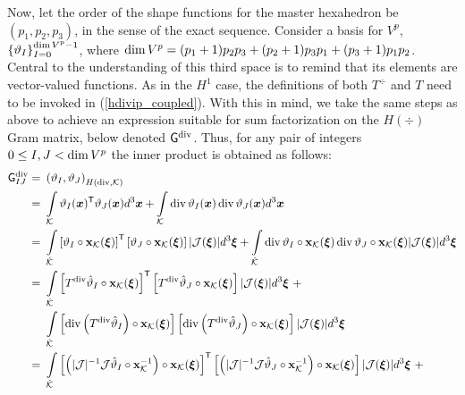 Now, let the order of the shape functions for the master hexahedron be $(p_1,p_2,p_3)$, in the sense of the exact sequence. Consider a basis for $V^p$, $\left\{ \vartheta_I \right\}_{I=0}^{\operatorname*{dim} V^p-1}$, where $\operatorname*{dim} V^p=(p_1+1)p_2p_3+(p_2+1)p_3p_1+(p_3+1)p_1p_2$. Central to the understanding of this third space is to remind that its elements are vector-valued functions. As in the $H^1$ case, the definitions of both $T^{\div}$ and $T$ need to be invoked in (\ref{hdivip_coupled}). With this in mind, we take the same steps as above to achieve an expression suitable for sum factorization on the $H(\div)$ Gram matrix, below denoted $\mathsf{G}^{\operatorname{div}}$. Thus, for any pair of integers $0\leq I,J<\operatorname*{dim} V^p$ the inner product is obtained as follows:
% 
\begin{align}
                          \sfG^{\div}_{IJ}  =\ &\left(\vartheta_I,\vartheta_J\right)_{\HSo(\div,\mcK)} \nonumber\\
                                        \ =\ & \int\limits_{\mcK}\vartheta_I(\bsx)^\T\vartheta_J(\bsx)d^3\bsx + \int\limits_{\mcK}\div\vartheta_I(\bsx)\div\vartheta_J(\bsx)d^3\bsx \nonumber\\ 
                                        \ =\ & \int\limits_{\hatK}\left[\vartheta_I\circ\bfx_\mcK(\bsxi)\right]^\T\left[\vartheta_J\circ\bfx_\mcK(\bsxi)\right]|\mcJ(\bsxi)|d^3\bsxi +
                                        \int\limits_{\hatK}\div\vartheta_I\circ\bfx_\mcK(\bsxi)\div\vartheta_J\circ\bfx_\mcK(\bsxi)|\mcJ(\bsxi)|d^3\bsxi \nonumber\\ 
                                        \ =\ & \int\limits_{\hatK}
                                        \left[T^{\div}\hat{\vartheta}_I\circ\bfx_\mcK(\bsxi)\right]^\T\left[T^{\div}\hat{\vartheta}_J\circ\bfx_\mcK(\bsxi)\right]|\mcJ(\bsxi)|d^3\bsxi \ +\nonumber\\*
                                        \ & \int\limits_{\hatK}
                                        \left[\div\left(T^{\div}\hat{\vartheta}_I\right)\circ\bfx_\mcK(\bsxi)\right]\left[\div \left(T^{\div}\hat{\vartheta}_J\right)\circ\bfx_\mcK(\bsxi)\right]|\mcJ(\bsxi)|d^3\bsxi \nonumber\\ 
                                        =\ & \int\limits_{\hatK}
                                        \left[\left(|\mcJ|^{-1}\mcJ\hat{\vartheta}_I\circ\bfx_\mcK^{-1}\right)\circ\bfx_\mcK(\bsxi)\right]^\T\left[\left(|\mcJ|^{-1}\mcJ\hat{\vartheta}_J\circ\bfx_\mcK^{-1}\right)\circ\bfx_\mcK(\bsxi)\right]|\mcJ(\bsxi)|d^3\bsxi \ +\nonumber\\*

\end{align}
